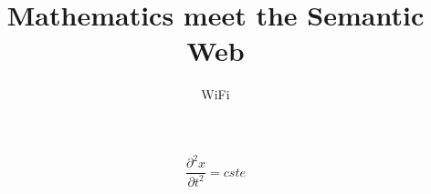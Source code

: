 \documentclass{article}
\title{Mathematics meet the Semantic Web}
\author{WiFi}
\begin{document}
\maketitle


$$\frac{\partial^2 x}{\partial t^2}=cste$$
\end{document}
